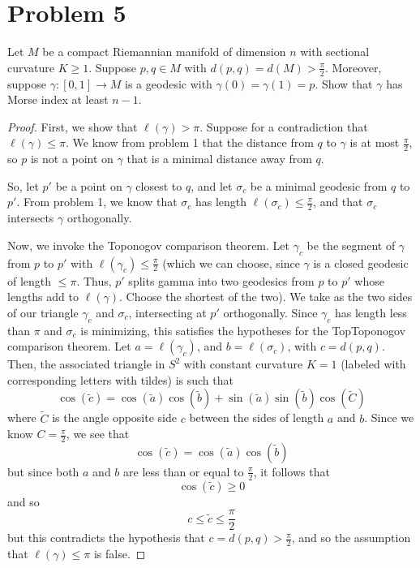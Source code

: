 \documentclass[fontsize=11pt]{scrartcl} %
\numberwithin{equation}{section} %
\numberwithin{figure}{section} %
\numberwithin{table}{section} %
\begin{document}
\newpage

\section*{Problem 5}
Let $M$ be a compact Riemannian manifold of dimension $n$ with sectional
curvature $K\geq 1$. Suppose $p,q\in M$ with $d(p,q)=d(M)>\frac{\pi}{2}$.
Moreover, suppose $\gamma:[0,1]\to M$ is a geodesic with
$\gamma(0)=\gamma(1)=p$. Show that $\gamma$ has Morse index at least $n-1$.

\begin{proof}
    First, we show that $\ell(\gamma) > \pi$. 
    Suppose for a contradiction that $\ell(\gamma)\leq \pi$. We know from
    problem 1 that the distance from $q$ to $\gamma$ is at most
    $\frac{\pi}{2}$, so $p$ is not a point on $\gamma$ that is a minimal
    distance away from $q$.
    
    So, let $p'$ be a point on $\gamma$ closest to $q$, and let $\sigma_c$ be
    a minimal geodesic from $q$ to $p'$. From problem 1, we know that
    $\sigma_c$ has length $\ell(\sigma_c)\leq \frac{\pi}{2}$, and that
    $\sigma_c$ intersects $\gamma$ orthogonally. 

    Now, we invoke the Toponogov comparison theorem. Let $\gamma_c$ be the
    segment of $\gamma$ from $p$ to $p'$ with
    $\ell(\gamma_c)\leq\frac{\pi}{2}$ (which we can choose, since $\gamma$ is a
        closed geodesic of length $\leq \pi$. Thus, $p'$ splits gamma into two
        geodesics from $p$ to $p'$ whose lengths add to $\ell(\gamma)$. Choose
    the shortest of the two).
    We take as the two sides of our triangle $\gamma_c$ and $\sigma_c$,
    intersecting at $p'$ orthogonally. Since $\gamma_c$ has length less than
    $\pi$ and $\sigma_c$ is minimizing, this satisfies the hypotheses for the
    TopToponogov comparison theorem. Let $a=\ell(\gamma_c)$, and
    $b=\ell(\sigma_c)$, with $c=d(p,q)$. Then, the associated triangle in $S^2$
    with constant curvature $K=1$ (labeled with corresponding letters with
    tildes) is such that
    \[
        \cos(\tilde{c}) = \cos(\tilde{a})\cos(\tilde{b}) +
        \sin(\tilde{a})\sin(\tilde{b})\cos(\tilde{C})
    \]
    where $\tilde{C}$ is the angle opposite side $c$ between the sides of length
    $a$ and $b$. Since we know $C=\frac{\pi}{2}$, we see that
    \[
        \cos(\tilde{c}) = \cos(\tilde{a})\cos(\tilde{b})
    \]
    but since both $a$ and $b$ are less than or equal to $\frac{\pi}{2}$, it
    follows that
    \[
        \cos(\tilde{c})\geq 0
    \]
    and so
    \[
        c\leq \tilde{c} \leq \frac{\pi}{2}
    \]
    but this contradicts the hypothesis that $c=d(p,q)>\frac{\pi}{2}$, and so
    the assumption that $\ell(\gamma)\leq \pi$ is false.


\end{proof}
\end{document}
